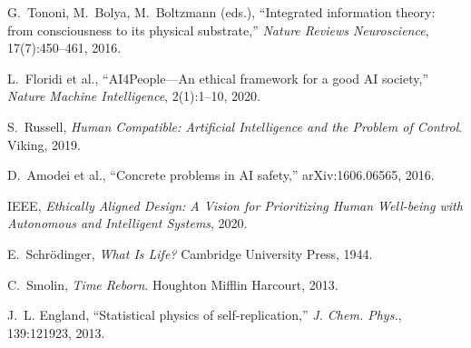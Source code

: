 \documentclass[11pt,a4paper]{article}
\begin{document}
\begin{thebibliography}{99}
G.~Tononi, M.~Bolya, M.~Boltzmann (eds.), ``Integrated information theory: from consciousness to its physical substrate,'' \emph{Nature Reviews Neuroscience}, 17(7):450–461, 2016.

L.~Floridi et al., ``AI4People—An ethical framework for a good AI society,'' \emph{Nature Machine Intelligence}, 2(1):1–10, 2020.

S.~Russell, \emph{Human Compatible: Artificial Intelligence and the Problem of Control}. Viking, 2019.

D.~Amodei et al., ``Concrete problems in AI safety,'' arXiv:1606.06565, 2016.

IEEE, \emph{Ethically Aligned Design: A Vision for Prioritizing Human Well-being with Autonomous and Intelligent Systems}, 2020.

E.~Schr\"odinger, \emph{What Is Life?} Cambridge University Press, 1944.

C.~Smolin, \emph{Time Reborn}. Houghton Mifflin Harcourt, 2013.

J.~L. England, ``Statistical physics of self-replication,'' \emph{J. Chem. Phys.}, 139:121923, 2013.

\end{thebibliography}
\end{document}
